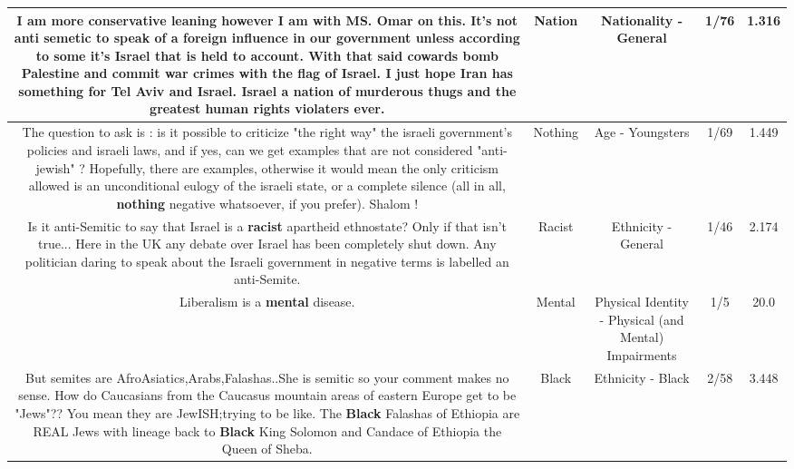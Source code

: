 \documentclass[11pt]{article}
\newlength\mylength
\begin{document}
\begin{center}
\begin{longtable}{|C{.65\mylength}|C{.30\mylength}|C{.12\mylength}|C{.12\mylength}|C{.12\mylength}|}
  \small I am more conservative leaning however I am with MS. Omar on this. It's not anti semetic to speak of a foreign influence in our government unless according to some it's Israel that is held to account. With that said cowards bomb Palestine and commit war crimes with the flag of Israel. I just hope Iran has something for Tel Aviv and Israel. Israel a \textbf{nation} of murderous thugs and the greatest human rights violaters ever.\normalsize   & Nation & Nationality - General & 1/76 & 1.316 \\  \hline
  \small The question to ask is : is it possible to criticize "the right way" the israeli government's policies and israeli laws, and if yes, can we get examples that are not considered "anti-jewish" ? Hopefully, there are examples, otherwise it would mean the only criticism allowed is an unconditional eulogy of the israeli state, or a complete silence (all in all, \textbf{nothing} negative whatsoever, if you prefer). Shalom !\normalsize   & Nothing & Age - Youngsters & 1/69 & 1.449 \\  \hline
  \small Is it anti-Semitic to say that Israel is a \textbf{racist} apartheid ethnostate? Only if that isn't true... Here in the UK any debate over Israel has been completely shut down. Any politician daring to speak about the Israeli government in negative terms is labelled an anti-Semite.\normalsize   & Racist & Ethnicity - General & 1/46 & 2.174 \\  \hline
  \small Liberalism is a \textbf{mental} disease.\normalsize   & Mental & Physical Identity - Physical (and Mental) Impairments & 1/5 & 20.0 \\  \hline
  \small But semites are AfroAsiatics,Arabs,Falashas..She is semitic so your comment makes no sense. How do Caucasians from the Caucasus mountain areas of eastern Europe get to be "Jews"??  You mean they are JewISH;trying to be like. The \textbf{Black} Falashas of Ethiopia are REAL Jews with lineage back to \textbf{Black} King Solomon and Candace of Ethiopia the Queen of Sheba.\normalsize   & Black & Ethnicity - Black & 2/58 & 3.448 \\  \hline

\end{longtable}
\end{center}
\end{document}
